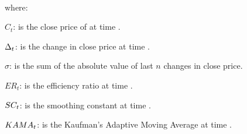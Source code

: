 \documentclass{article}
\begin{document}
\\ %
where:

$C_{t}$: is the close price of at time \currenttime.

$\Delta_{t}$: is the change in close price at time \currenttime.

$\sigma$: is the sum of the absolute value of last $n$ changes in close price.

$ER_{t}$: is the efficiency ratio at time \currenttime.

$SC_{t}$: is the smoothing constant at time \currenttime.

$KAMA_{t}$: is the Kaufman's Adaptive Moving Average at time \currenttime.

\keyterms
\furtherlinks %
\end{document}
